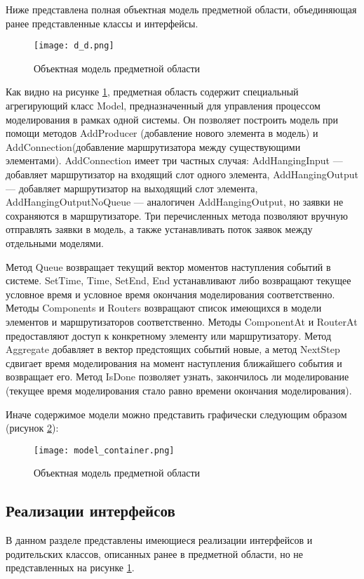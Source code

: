 Ниже представлена полная объектная модель предметной области, объединяющая ранее представленные классы и интерфейсы.
\begin{figure}[H]
	\centering
	\texttt{[image: d\_d.png]}
	\caption{Объектная модель предметной области}
	\label{d_d}
\end{figure}

Как видно на рисунке \ref{d_d}, предметная область содержит специальный агрегирующий класс Model, предназначенный для управления процессом моделирования в рамках одной системы. Он позволяет построить модель при помощи методов AddProducer (добавление нового элемента в модель) и AddConnection(добавление маршрутизатора между существующими элементами). AddConnection имеет три частных случая: AddHangingInput --- добавляет маршрутизатор на входящий слот одного элемента, AddHangingOutput --- добавляет маршрутизатор на выходящий слот элемента, AddHangingOutputNoQueue --- аналогичен AddHangingOutput, но заявки не сохраняются в маршрутизаторе. Три перечисленных метода позволяют вручную отправлять заявки в модель, а также устанавливать поток заявок между отдельными моделями.

Метод Queue возвращает текущий вектор моментов наступления событий в системе. SetTime, Time, SetEnd, End устанавливают либо возвращают текущее условное время и условное время окончания моделирования соответственно. Методы Components и Routers возвращают список имеющихся в модели элементов и маршрутизаторов соответственно. Методы ComponentAt и RouterAt предоставляют доступ к конкретному элементу или маршрутизатору. Метод Aggregate добавляет в вектор предстоящих событий новые, а метод NextStep сдвигает время моделирования на момент наступления ближайшего события и возвращает его. Метод IsDone позволяет узнать, закончилось ли моделирование (текущее время моделирования стало равно времени окончания моделирования).

Иначе содержимое модели можно представить графически следующим образом (рисунок \ref{model_container}):
\begin{figure}[H]
	\centering
	\texttt{[image: model\_container.png]}
	\caption{Объектная модель предметной области}
	\label{model_container}
\end{figure}

\subsection{Реализации интерфейсов}
В данном разделе представлены имеющиеся реализации интерфейсов и родительских классов, описанных ранее в предметной области, но не представленных на рисунке \ref{d_d}.

